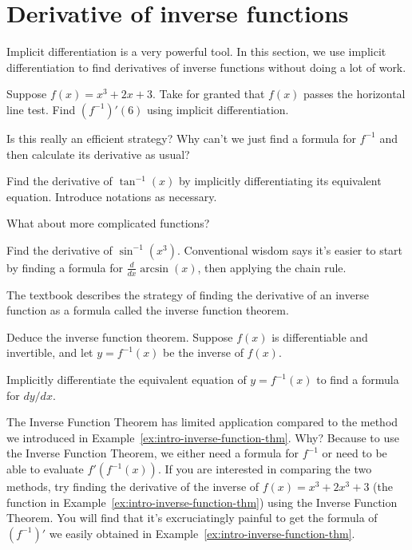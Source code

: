 \documentclass[../main.tex]{subfiles}
\begin{document}
 \section{Derivative of inverse functions}
  Implicit differentiation is a very powerful tool. In this section, we use implicit differentiation to find derivatives of inverse functions without doing a lot of work. 

  \begin{example} \label{ex:intro-inverse-function-thm}
    Suppose \(f(x) = x^{3} + 2x + 3\). Take for granted that \(f(x)\) passes the horizontal line test. Find \((f^{-1})'(6)\) using implicit differentiation.
  \end{example}
  \faComment{} Is this really an efficient strategy? Why can't we just find a formula for \(f^{-1}\) and then calculate its derivative as usual?
  \clearpage

  \begin{example} \label{ex:derivative-of-arctan}
    Find the derivative of \(\tan^{-1}(x)\) by implicitly differentiating its equivalent equation.  
    Introduce notations as necessary.

  \end{example}
  
  What about more complicated functions? 
  \begin{example} \label{ex:derivative-of-arcsin}
    Find the derivative of \(\sin^{-1}(x^{3})\).  Conventional wisdom says it's easier to start by finding a formula for \(\frac{d}{dx} \arcsin(x)\), then applying the chain rule.

  \end{example}
  \clearpage

  The textbook describes the strategy of finding the derivative of an inverse function as a formula called the inverse function theorem. 
  \begin{example}
    Deduce the inverse function theorem.  Suppose \(f(x)\) is differentiable and invertible, and let \(y = f^{-1}(x)\) be the inverse of \(f(x)\).

    Implicitly differentiate the equivalent equation of \(y = f^{-1}(x)\) to find a formula for \(dy/dx\).

  \end{example}

  \faExclamationTriangle{} The Inverse Function Theorem has limited application compared to the method we introduced in Example~\ref{ex:intro-inverse-function-thm}. Why? Because to use the Inverse Function Theorem, we either need a formula for \(f^{-1}\) or need to be able to evaluate \(f'(f^{-1}(x))\). If you are interested in comparing the two methods, try finding the derivative of the inverse of \(f(x) = x^{3} + 2x^{3} + 3\) (the function in Example~\ref{ex:intro-inverse-function-thm}) using the Inverse Function Theorem. You will find that it's excruciatingly painful to get the formula of \((f^{-1})'\) we easily obtained in Example~\ref{ex:intro-inverse-function-thm}.

  
\end{document}

